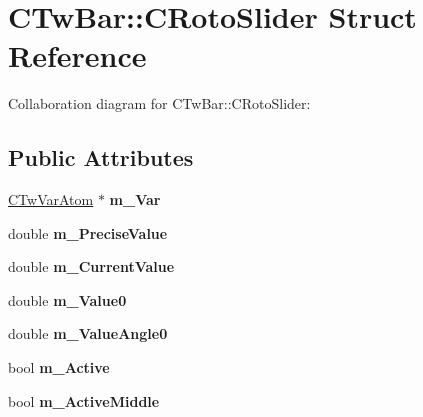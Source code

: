 \hypertarget{struct_c_tw_bar_1_1_c_roto_slider}{\section{C\+Tw\+Bar\+:\+:C\+Roto\+Slider Struct Reference}
\label{struct_c_tw_bar_1_1_c_roto_slider}
}


Collaboration diagram for C\+Tw\+Bar\+:\+:C\+Roto\+Slider\+:
\subsection*{Public Attributes}
\begin{DoxyCompactItemize}
\item 
\hypertarget{struct_c_tw_bar_1_1_c_roto_slider_a6867dac6edb52f51d1a125e0ef747329}{\hyperlink{struct_c_tw_var_atom}{C\+Tw\+Var\+Atom} $\ast$ {\bfseries m\+\_\+\+Var}}\label{struct_c_tw_bar_1_1_c_roto_slider_a6867dac6edb52f51d1a125e0ef747329}

\item 
\hypertarget{struct_c_tw_bar_1_1_c_roto_slider_adb269163630fd0c0f4d05d1411555e4f}{double {\bfseries m\+\_\+\+Precise\+Value}}\label{struct_c_tw_bar_1_1_c_roto_slider_adb269163630fd0c0f4d05d1411555e4f}

\item 
\hypertarget{struct_c_tw_bar_1_1_c_roto_slider_ad10f8869c8019f0d8363fb99d6203ea5}{double {\bfseries m\+\_\+\+Current\+Value}}\label{struct_c_tw_bar_1_1_c_roto_slider_ad10f8869c8019f0d8363fb99d6203ea5}

\item 
\hypertarget{struct_c_tw_bar_1_1_c_roto_slider_aaa43c91382181d5a00ac4d159c83f4d0}{double {\bfseries m\+\_\+\+Value0}}\label{struct_c_tw_bar_1_1_c_roto_slider_aaa43c91382181d5a00ac4d159c83f4d0}

\item 
\hypertarget{struct_c_tw_bar_1_1_c_roto_slider_a14cbb063f88410b5e988d60e27f3841b}{double {\bfseries m\+\_\+\+Value\+Angle0}}\label{struct_c_tw_bar_1_1_c_roto_slider_a14cbb063f88410b5e988d60e27f3841b}

\item 
\hypertarget{struct_c_tw_bar_1_1_c_roto_slider_acd8555baeaf24825d19c966793a12de6}{bool {\bfseries m\+\_\+\+Active}}\label{struct_c_tw_bar_1_1_c_roto_slider_acd8555baeaf24825d19c966793a12de6}

\item 
\hypertarget{struct_c_tw_bar_1_1_c_roto_slider_a4f7783dc3bc9e5fb9c3f0bdf15fc96c2}{bool {\bfseries m\+\_\+\+Active\+Middle}}\label{struct_c_tw_bar_1_1_c_roto_slider_a4f7783dc3bc9e5fb9c3f0bdf15fc96c2}


\end{DoxyCompactItemize}
